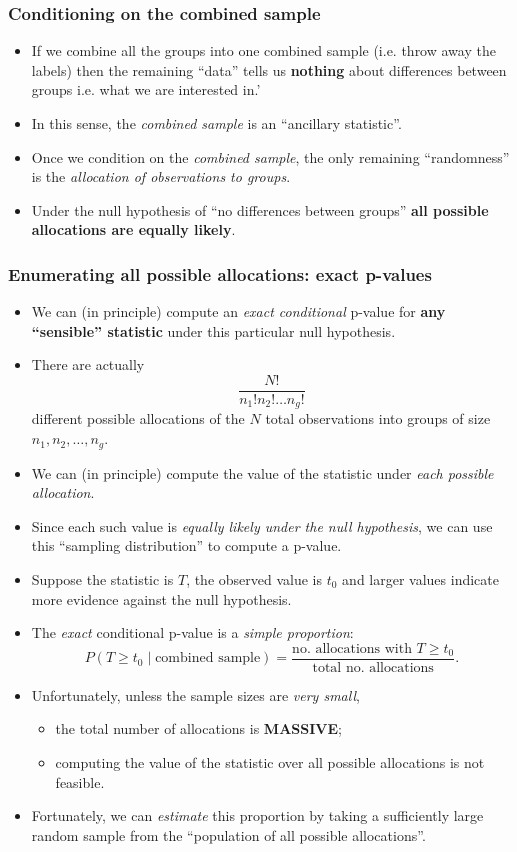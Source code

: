 \documentclass[a4paper]{article}\usepackage[]{graphicx}\usepackage[]{xcolor}
\begin{document}
\subsubsection{Conditioning on the combined sample}
\begin{itemize}
	\item If we combine all the groups into one combined sample (i.e. throw away the labels) then the remaining ``data'' tells us \textbf{nothing} about differences between groups i.e. what we are interested in.'
	\item In this sense, the \textit{combined sample} is an ``ancillary statistic''.
	\item Once we condition on the \textit{combined sample}, the only remaining ``randomness'' is the \textit{allocation of observations to groups}.
	\item Under the null hypothesis of ``no differences between groups'' \textbf{all possible allocations are equally likely}.
\end{itemize}
\subsubsection{Enumerating all possible allocations: exact p-values}
\begin{itemize}
	\item We can (in principle) compute an \textit{exact conditional} p-value for \textbf{any ``sensible'' statistic} under this particular null hypothesis.
	\item There are actually
	\[
		\frac{N!}{n_1!n_2!\ldots n_g!}
	\]
	different possible allocations of the \( N \) total observations into groups of size \( n_1,n_2,\dotsc,n_g \).
	\item We can (in principle) compute the value of the statistic under \textit{each possible allocation}.
	\item Since each such value is \textit{equally likely under the null hypothesis}, we can use this ``sampling distribution'' to compute a p-value.
	\item Suppose the statistic is \( T \), the observed value is \( t_0 \) and larger values indicate more evidence against the null hypothesis.
	\item The \textit{exact} conditional p-value is a \textit{simple proportion}:
	\[
			P(T\geq t_0 \mid \text{combined sample}) = \frac{\text{no. allocations with }T\geq t_0}{\text{total no. allocations}}.
	\]
	\item Unfortunately, unless the sample sizes are \textit{very small},
	\begin{itemize}
		\item the total number of allocations is \textbf{MASSIVE};
		\item computing the value of the statistic over all possible allocations is not feasible.
	\end{itemize}
	\item Fortunately, we can \textit{estimate} this proportion by taking a sufficiently large random sample from the ``population of all possible allocations''.
\end{itemize}
\end{document}
